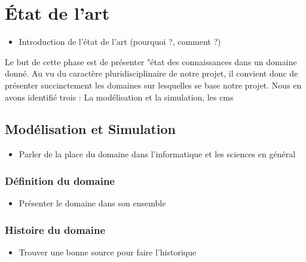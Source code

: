 \documentclass{rapport_stage}
\begin{document}

\chapter{État de l'art}


\begin{itemize}[label=$\bullet$]
  \item Introduction de l'état de l'art (pourquoi ?, comment ?)
\end{itemize}

Le but de cette phase est de présenter "état des connaissances dans un domaine
donné. Au vu du caractère pluridisciplinaire de notre projet, il convient donc
de présenter succinctement les domaines sur lesquelles se base notre projet.
Nous en avons identifié trois : La modélisation et la simulation, les
\gls{cms}

\section{Modélisation et Simulation}

\begin{itemize}[label=$\bullet$]
  \item Parler de la place du domaine dans l'informatique et les sciences en général
\end{itemize}

\subsection*{Définition du domaine}

\begin{itemize}[label=$\bullet$]
  \item Présenter le domaine dans son ensemble \cite{oren_body_2023}
\end{itemize}

\newpage

\subsection*{Histoire du domaine}

\begin{itemize}[label=$\bullet$]
  \item Trouver une bonne source pour faire l'historique
\end{itemize}
\end{document}
